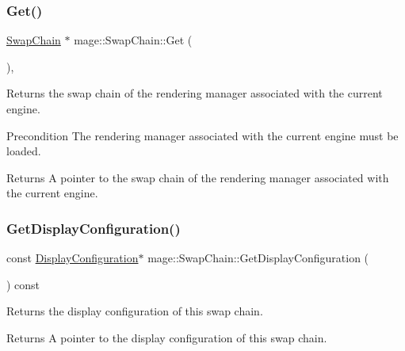 \subsubsection{\texorpdfstring{Get()}{Get()}}
{\footnotesize\ttfamily \hyperlink{classmage_1_1_swap_chain}{Swap\+Chain} $\ast$ mage\+::\+Swap\+Chain\+::\+Get (\begin{DoxyParamCaption}{ }\end{DoxyParamCaption})\hspace{0.3cm}{\ttfamily [static]}, {\ttfamily [noexcept]}}

Returns the swap chain of the rendering manager associated with the current engine.

\begin{DoxyPrecond}{Precondition}
The rendering manager associated with the current engine must be loaded. 
\end{DoxyPrecond}
\begin{DoxyReturn}{Returns}
A pointer to the swap chain of the rendering manager associated with the current engine. 
\end{DoxyReturn}
\hypertarget{classmage_1_1_swap_chain_afb7cf408081f09d0241f3e764a047e74}{}\label{classmage_1_1_swap_chain_afb7cf408081f09d0241f3e764a047e74} 
\subsubsection{\texorpdfstring{Get\+Display\+Configuration()}{GetDisplayConfiguration()}}
{\footnotesize\ttfamily const \hyperlink{structmage_1_1_display_configuration}{Display\+Configuration}$\ast$ mage\+::\+Swap\+Chain\+::\+Get\+Display\+Configuration (\begin{DoxyParamCaption}{ }\end{DoxyParamCaption}) const\hspace{0.3cm}{\ttfamily [noexcept]}}

Returns the display configuration of this swap chain.

\begin{DoxyReturn}{Returns}
A pointer to the display configuration of this swap chain. 
\end{DoxyReturn}
\hypertarget{classmage_1_1_swap_chain_a0b54dff5a39f10d9073bdbb1121a6144}{}\label{classmage_1_1_swap_chain_a0b54dff5a39f10d9073bdbb1121a6144} 
